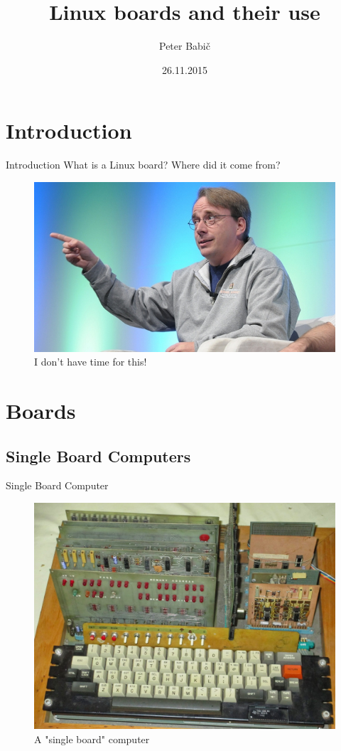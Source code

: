 \documentclass[hyperref={unicode}]{beamer}
\title[Linux Boards]{Linux boards and their use}
\author{Peter Babič}
\institute{Technical University of Košice, Slovakia \\ Computer Modelling, Masters}
\date{26.11.2015}
\begin{document}
\titlepage




\section{Introduction}

\begin{frame}{Introduction}
	What is a Linux board? Where did it come from?
	\begin{figure}
	\includegraphics[width=.7\textwidth]{linus-torvalds-linuxcon.jpg}
	\caption{I don't have time for this!}
	\end{figure}
\end{frame}


\section{Boards}





\subsection{Single Board Computers}

\begin{frame}{Single Board Computer}
\begin{figure}
\includegraphics[width=.7\textwidth]{scelbi.jpg}
\caption{A "single board" computer}
\end{figure}
\end{frame}
\end{document}
